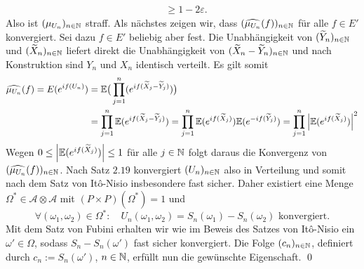 \begin{proof*}
\begin{align*}
                                                              &\geq 1 - 2 \varepsilon.                                              
    \end{align*}
    Also ist $(\mu_{U_n})_{n \in \mathbb{N}}$ straff. 
    Als nächstes zeigen wir, dass $(\widehat{\mu_{U_n}}(f))_{n \in \mathbb{N}}$ für alle $f \in E'$ konvergiert. Sei dazu $f \in E'$ beliebig aber fest. 
    Die Unabhängigkeit von $(\widetilde{Y}_n)_{n \in \mathbb{N}}$ und $(\widetilde{X}_n)_{n \in \mathbb{N}}$ liefert direkt die Unabhängigkeit von $(\widetilde{X}_n - \widetilde{Y}_n)_{n \in \mathbb{N}}$
    und nach Konstruktion sind $Y_n$ und $X_n$ identisch verteilt. Es gilt somit
    \begin{align*}
        \widehat{\mu_{U_n}}(f) = E(e^{if(U_n)}) &= \mathbb{E}\big(\prod_{j=1}^n(e^{if(\widetilde{X}_j-\widetilde{Y}_j)})\big) \\\
                                                &= \prod_{j=1}^n \mathbb{E}(e^{if(\widetilde{X}_j-\widetilde{Y}_j)})
                                                 = \prod_{j=1}^n \mathbb{E}(e^{if(\widetilde{X}_j)})\mathbb{E}(e^{-if(\widetilde{Y}_j)})
                                                 = \prod_{j=1}^n \left| \mathbb{E}(e^{if(\widetilde{X}_j)}) \right|^2
    \end{align*}
    Wegen $0 \leq \left| \mathbb{E}(e^{if(\widetilde{X}_j)}) \right| \leq 1$ für alle $j \in \mathbb{N}$ folgt daraus die Konvergenz von $(\widehat{\mu_{U_n}}(f))_{n \in \mathbb{N}}$. 
    Nach Satz $2.19$ konvergiert $(U_n)_{n \in \mathbb{N}}$ also in Verteilung und somit nach dem Satz von Itô-Nisio insbesondere fast sicher. 
    Daher existiert eine Menge $\Omega^* \in \mathcal{A} \otimes \mathcal{A}$ mit $(P\times P)(\Omega^*) = 1$ und 
    $$
        \forall (\omega_1, \omega_2) \in \Omega^*: \quad U_n(\omega_1, \omega_2) = S_n(\omega_1) - S_n(\omega_2) \text{ konvergiert.}
    $$
    Mit dem Satz von Fubini erhalten wir wie im Beweis des Satzes von Itô-Nisio ein $\omega' \in \Omega$, sodass $S_n - S_n(\omega')$ fast sicher konvergiert. 
    Die Folge $(c_n)_{n \in \mathbb{N}}$, definiert durch $c_n := S_n(\omega')$, $n \in \mathbb{N}$, erfüllt nun die gewünschte Eigenschaft. \qed

\end{proof*}

